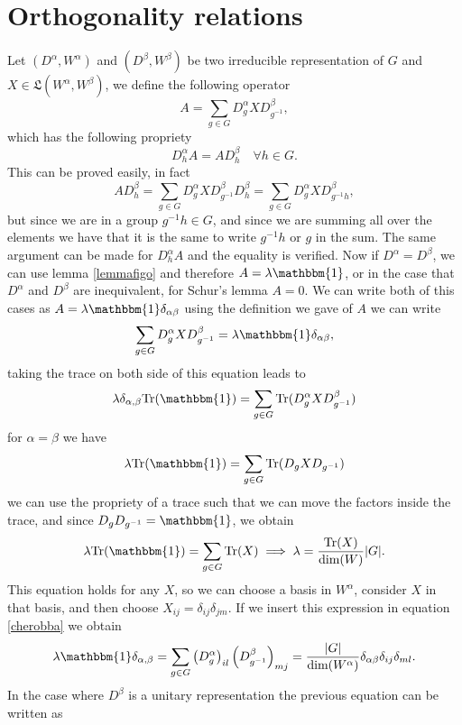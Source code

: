 \documentclass[12pt]{book}
\theoremstyle{plain}
\newcommand{\I}{\mathbbm{1}}
\theoremstyle{definition}
\theoremstyle{remark}
\begin{document}
\section{Orthogonality relations}
Let $(D^\alpha,W^\alpha)$ and $(D^\beta,W^\beta)$ be two irreducible representation of $G$ and $X\in \mathfrak{L}(W^\alpha,W^\beta)$, we define the following operator 
\[A =\sum_{g\in G} D_g^\alpha X D_{g^{-1}}^\beta,\]
which has the following propriety
\[D_h ^\alpha A = A D_h^\beta \quad \forall h\in G.\]
This can be proved easily, in fact
\[A D_h^\beta = \sum_{g\in G} D_g^\alpha X D_{g^{-1}}^\beta  D_h^\beta = \sum_{g\in G} D_g^\alpha X D_{g^{-1}h}^\beta,\]
but since we are in a group $g^{-1}h\in G$, and since we are summing all over the elements we have that it is the same to write $g^{-1}h$ or $g$ in the sum. The same argument can be made for $D_h ^\alpha A$ and the equality is verified. Now if $D^\alpha = D^\beta$, we can use lemma \ref{lemmafigo} and therefore $A = \lambda \I$, or in the case that $D^\alpha$ and $D^\beta$ are inequivalent, for Schur's lemma $A=0$. We can write both of this cases as $A = \lambda \I \delta_{\alpha\beta}$ using the definition we gave of $A$ we can write
\begin{equation}\label{cherobba}\sum_{g\in G} D_g^\alpha X D_{g^{-1}}^\beta = \lambda \I \delta_{\alpha\beta},\end{equation}
taking the trace on both side of this equation leads to
\begin{equation}\lambda \delta_{\alpha,\beta}\text{Tr}(\I) = \sum_{g\in G} \text{Tr}(D_g^\alpha X D_{g^{-1}}^\beta)\end{equation}
for $\alpha =\beta$ we have 
\[\lambda \text{Tr}(\I) = \sum_{g\in G} \text{Tr}(D_g X D_{g^{-1}})\]
we can use the propriety of a trace such that we can move the factors inside the trace, and since $D_g D_{g^{-1}}=\I$, we obtain
\begin{equation}\label{lambdafromtrace}\lambda \text{Tr}(\I) = \sum_{g\in G} \text{Tr}(X) \implies \lambda = \frac{\text{Tr}(X)}{\text{dim}(W)}|G|.\end{equation}
This equation holds for any $X$, so we can choose a basis in $W^\alpha$, consider $X$ in that basis, and then choose $X_{ij} = \delta_{ij}\delta_{jm}$. If we insert this expression in equation \eqref{cherobba} we obtain
\[\lambda \I \delta_{\alpha,\beta} = \sum_{g\in G}\left(D_g^\alpha\right)_{il}\left(D_{g^{-1}}^\beta\right)_{mj} = \frac{|G|}{\text{dim}(W^{\alpha})} \delta_{\alpha\beta}\delta_{ij}\delta_{ml}.\]
In the case where $D^\beta$ is a unitary representation the previous equation can be written as
\end{document}
